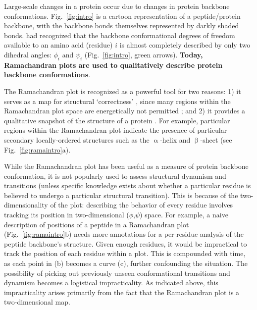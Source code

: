 \documentclass[fleqn,10pt,lineno]{wlpeerj} %
\newcommand{\Fig}[1]{Fig.~\ref{#1}}
\newcommand{\n}[1]{{\textbf{\color{red}#1}}}
\begin{document}
Large-scale changes in a protein occur due to changes in protein backbone conformations. %
\Fig{fig:intro} is a cartoon representation of a peptide/protein backbone, with the backbone bonds themselves represented by darkly shaded bonds. \cite{Ramachandran1963} had recognized that the backbone conformational degrees of freedom available to an amino acid (residue) $i$ is almost completely described by only two dihedral angles: $\phi_i$ and $\psi_i$ (\Fig{fig:intro}, green arrows). %
\n{Today, Ramachandran plots are used to qualitatively describe protein backbone conformations}.

The Ramachandran plot is recognized as a powerful tool for two reasons: 1) it serves as a map for structural `correctness' \citep{Laskowski1993,Hooft1997,Laskowski2003}, since many regions within the Ramachandran plot space are energetically not permitted \citep{Momen2017}; and 2) it provides a qualitative snapshot of the structure of a protein \citep{Berg2006,Alberts2002,Subramanian2001,Lovell2003}. For example, particular regions within the Ramachandran plot indicate the presence of particular secondary locally-ordered structures such as the $\upalpha$-helix and $\upbeta$-sheet (see \Fig{fig:ramaintro}a).

While the Ramachandran plot has been useful as a measure of protein backbone conformation, it is not popularly used to assess structural dynamism and transitions (unless specific knowledge exists about whether a particular residue is believed to undergo a particular structural transition). This is because of the two-dimensionality of the plot: describing the behavior of every residue involves tracking its position in two-dimensional ($\phi$,$\psi$) space. For example, a naive description of positions of a peptide in a Ramachandran plot (\Fig{fig:ramaintro}b) needs more annotations for a per-residue analysis of the peptide backbone's structure. Given enough residues, it would be impractical to track the position of each residue within a plot. This is compounded with time, as each point in (b) becomes a curve (c), further confounding the situation. The possibility of picking out previously unseen conformational transitions and dynamism becomes a logistical impracticality. As indicated above, this impracticality arises primarily from the fact that the Ramachandran plot is a two-dimensional map.
\end{document}
